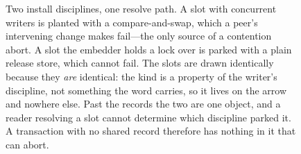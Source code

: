 \begin{figure}[t]
\caption{Two install disciplines, one resolve path. A slot with concurrent
writers is planted with a compare-and-swap, which a peer's intervening change
makes fail---the only source of a contention abort. A slot the embedder holds a
lock over is parked with a plain release store, which cannot fail. The slots are
drawn identically because they \emph{are} identical: the kind is a property of
the writer's discipline, not something the word carries, so it lives on the
arrow and nowhere else. Past the records the two are one object, and a reader
resolving a slot cannot determine which discipline parked it. A transaction with
no shared record therefore has nothing in it that can abort.}
\label{fig:kinds}
\end{figure}
